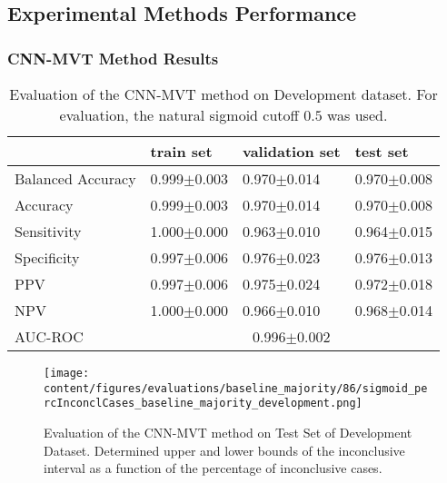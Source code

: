 \subsection{Experimental Methods Performance}
\label{subsec:exp_methods_perf}

\subsubsection{CNN-MVT Method Results}
\label{subsubsec:eval_mvt}






\begin{table}[ht]
  \caption{Evaluation of the CNN-MVT method on Development dataset. 
  For evaluation, the natural sigmoid cutoff $0.5$ was used.}
  \centering
  \begin{tabular}{llll}
      \hline
                        & train set         & validation set      & test set             \\
      \hline
      Balanced Accuracy & 0.999$\pm$0.003   &  0.970$\pm$0.014    &  0.970$\pm$0.008   \\
      Accuracy          & 0.999$\pm$0.003    &   0.970$\pm$0.014   &  0.970$\pm$0.008   \\
      Sensitivity       &  1.000$\pm$0.000   &   0.963$\pm$0.010   &  0.964$\pm$0.015  \\
      Specificity       &   0.997$\pm$0.006   &   0.976$\pm$0.023  &   0.976$\pm$0.013  \\
      PPV               &  0.997$\pm$0.006   &   0.975$\pm$0.024   &  0.972$\pm$0.018 \\
      NPV               &  1.000$\pm$0.000    &   0.966$\pm$0.010   & 0.968$\pm$0.014  \\
      \hline
      AUC-ROC          &  \multicolumn{3}{c}{0.996$\pm$0.002}  \\
      \hline
  \end{tabular}
 \label{t1:cnn_mvt_perf_eval_table}
\end{table}


\begin{figure}[t]
  \centering
  \texttt{[image: content/figures/evaluations/baseline\_majority/86/sigmoid\_percInconclCases\_baseline\_majority\_development.png]}
  \caption{Evaluation of the CNN-MVT method on Test Set of Development Dataset. 
  Determined upper and lower bounds of the inconclusive interval as a function of the percentage of inconclusive cases.} 
  \label{fig:baseline_majority_percInconclCases_development}
\end{figure}


